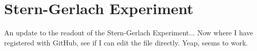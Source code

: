 \section{Stern-Gerlach Experiment}
An update to the readout of the Stern-Gerlach Experiment...
Now where I have registered with GitHub, see if I can edit the file directly. Yeap, seems to work.
